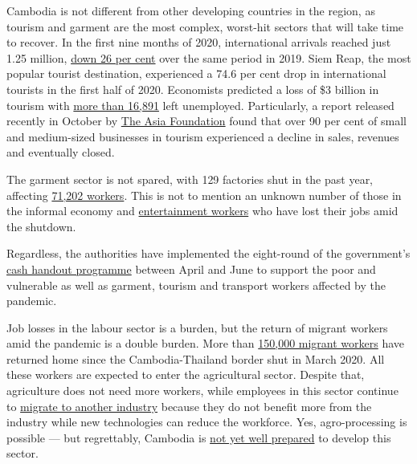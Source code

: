 \documentclass[10pt,a4paper]{letter}
\begin{document}
Cambodia is not different from other developing countries in the region, as tourism and garment are the most complex, worst-hit sectors that will take time to recover. In the first nine months of 2020, international arrivals reached just 1.25 million, \href{http://documents1.worldbank.org/curated/en/986491608013945613/pdf/Cambodia-Economic-Update-Restrained-Recovery-Special-Focus-Adapting-to-COVID-19-in-an-Uncertain-World.pdf}{down 26 per cent} over the same period in 2019. Siem Reap, the most popular tourist destination, experienced a 74.6 per cent drop in international tourists in the first half of 2020. Economists predicted a loss of \$3 billion in tourism with \href{http://www.xinhuanet.com/english/2020-06/01/c_139105722.htm}{more than 16,891} left unemployed. Particularly, a report released recently in October by \href{https://asiafoundation.org/publication/enduring-the-pandemic-rapid-survey-on-the-impact-of-covid-19-on-msmes-in-the-tourism-sector-and-households-in-cambodia/}{The Asia Foundation} found that over 90 per cent of small and medium-sized businesses in tourism experienced a decline in sales, revenues and eventually closed.

The garment sector is not spared, with 129 factories shut in the past year, affecting \href{https://www.phnompenhpost.com/business/chinese-propose-20-garment-footwear-factories-kampong-speu}{71,202 workers}. This is not to mention an unknown number of those in the informal economy and \href{https://vodenglish.news/opinion-covid-19-pandemic-supports-case-for-decriminalizing-sex-work/}{entertainment workers} who have lost their jobs amid the shutdown.

Regardless, the authorities have implemented the eight-round of the government's \href{https://www.facebook.com/CAMNSPC/posts/778279929460700}{cash handout programme} between April and June to support the poor and vulnerable as well as garment, tourism and transport workers affected by the pandemic.

Job losses in the labour sector is a burden, but the return of migrant workers amid the pandemic is a double burden. More than \href{https://www.reuters.com/article/us-cambodia-thailand-migrants-feature-tr-idUSKBN2AQ03B}{150,000 migrant workers} have returned home since the Cambodia-Thailand border shut in March 2020. All these workers are expected to enter the agricultural sector. Despite that, agriculture does not need more workers, while employees in this sector continue to \href{https://southeastasiaglobe.com/cambodias-agricultural-sector-is-one-in-dire-need-of-revitalising}{migrate to another industry} because they do not benefit more from the industry while new technologies can reduce the workforce. Yes, agro-processing is possible --- but regrettably, Cambodia is \href{https://www.phnompenhpost.com/opinion/kingdoms-agro-processing-potential}{not yet well prepared} to develop this sector.
\end{document}
